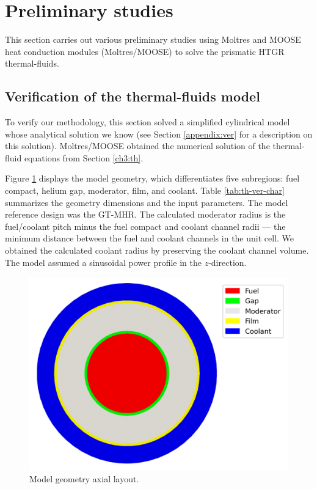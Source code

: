\label{ch:thermalfluids}

\section{Preliminary studies}

This section carries out various preliminary studies using Moltres and MOOSE heat conduction modules (Moltres/MOOSE) to solve the prismatic HTGR thermal-fluids.

\subsection{Verification of the thermal-fluids model}

To verify our methodology, this section solved a simplified cylindrical model whose analytical solution we know (see Section \ref{appendix:ver} for a description on this solution).
Moltres/MOOSE obtained the numerical solution of the thermal-fluid equations from Section \ref{ch3:th}.

Figure \ref{fig:th-ver-mesh} displays the model geometry, which differentiates five subregions: fuel compact, helium gap, moderator, film, and coolant.
Table \ref{tab:th-ver-char} summarizes the geometry dimensions and the input parameters.
The model reference design was the GT-MHR.
The calculated moderator radius is the fuel/coolant pitch minus the fuel compact and coolant channel radii --- the minimum distance between the fuel and coolant channels in the unit cell.
We obtained the calculated coolant radius by preserving the coolant channel volume.
The model assumed a sinusoidal power profile in the $z$-direction.

\begin{figure}[htbp!]
	\centering
	\includegraphics[width=0.25\linewidth]{figures-thermal/ver-mesh2}
	\hfill
	\caption{Model geometry axial layout.}
	\label{fig:th-ver-mesh}
\end{figure}

